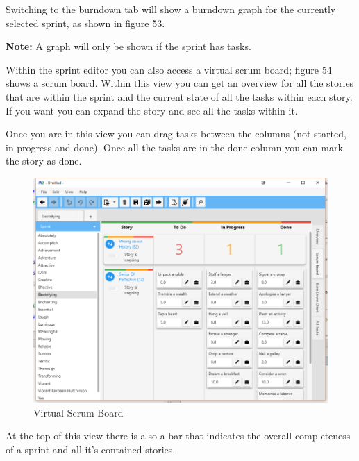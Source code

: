 Switching to the burndown tab will show a burndown graph for the currently selected sprint, as shown in figure 53.

\textbf{Note:}\newline
A graph will only be shown if the sprint has tasks.

Within the sprint editor you can also access a virtual scrum board; figure 54 shows a scrum board. Within this view you can get an overview for all the stories that are within the sprint and the current state of all the tasks within each story. If you want you can expand the story and see all the tasks within it.

Once you are in this view you can drag tasks between the columns (not started, in progress and done). Once all the tasks are in the done column you can mark the story as done.

\begin{figure}[H]
\centering
\includegraphics[width=\textwidth]{images/screenshots/scrumboard.png}
\caption{Virtual Scrum Board}
\label{fig:srumboard}
\end{figure}

At the top of this view there is also a bar that indicates the overall completeness of a sprint and all it's contained stories.